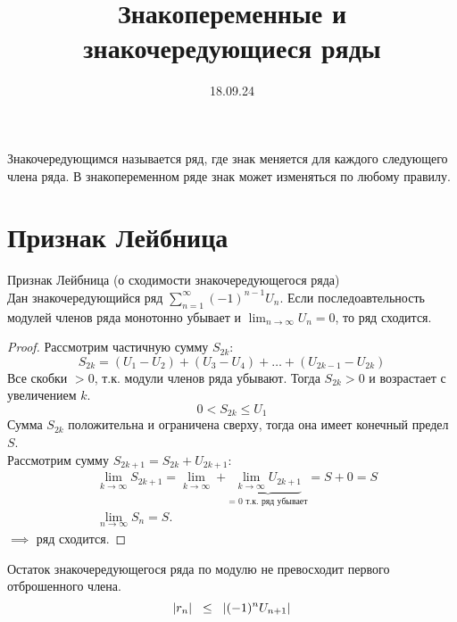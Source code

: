 

\title{Знакопеременные и знакочередующиеся ряды}
\date{18.09.24}


\maketitle
\begin{remark}
    Знакочередующимся называется ряд, где знак меняется 
    для каждого следующего члена ряда. В знакопеременном ряде 
    знак может изменяться по любому правилу.
\end{remark}

\section{Признак Лейбница}
\begin{thm}
    Признак Лейбница (о сходимости знакочередующегося ряда)\\
    Дан знакочередующийся ряд \(\sum_{n=1}^{\infty} (-1)^{n-1} U_{n}\). 
    Если последоавтельность модулей членов ряда монотонно убывает 
    и \(\lim_{n\to\infty} U_{n}=0\), то ряд сходится.
    \begin{proof}
        Рассмотрим частичную сумму \(S_{2k}\):
        \begin{equation}
            S_{2k} = (U_{1} - U_{2}) + (U_{3} - U_{4}) + 
            \dots + (U_{2k - 1} - U_{2k})
        \end{equation}
        Все скобки \(>0\), т.к. модули членов ряда убывают. 
        Тогда \(S_{2k} > 0\) и возрастает с увеличением \(k\).
        \begin{equation}
            0 < S_{2k} \leq U_{1}
        \end{equation}
        Сумма \(S_{2k}\) положительна и ограничена сверху, 
        тогда она имеет конечный предел \(S\). \\
        Рассмотрим сумму \(S_{2k+1} = S_{2k} + U_{2k+1}\):
        \begin{equation}
            \begin{align*}
                &\lim_{k\to\infty} S_{2k+1} = \lim_{k\to\infty} + \underbrace{\lim_{k\to\infty}U_{2k+1}}_{\text{= 0 т.к. ряд убывает}} = S+0= S\\
                &\lim_{n\to\infty}S_{n} = S.
            \end{align*}
        \end{equation}
        \(\implies\) ряд сходится.
    \end{proof}

    \begin{corollary}
        Остаток знакочередующегося ряда по модулю 
        не превосходит первого отброшенного члена.
        \begin{equation}
            |r_{n}| \hspace{0.2cm} \leq \hspace{0.2cm} |(-1)^{n}U_{n+1}|
        \end{equation}
    \end{corollary}
\end{thm}



